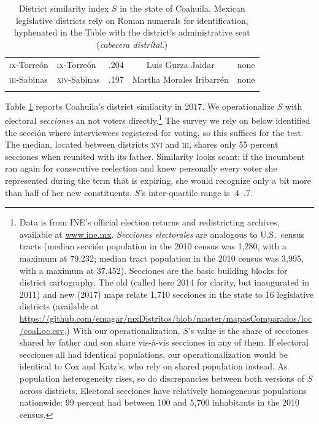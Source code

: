 \documentclass[letter,12pt]{article}
\begin{document}
\begin{table}
{\begin{tabular}{llrcc}
 \textsc{ix}-Torreón        & \textsc{ix}-Torreón         &  .204 & Luis Gurza Jaidar           & none            \\ 
 \textsc{iii}-Sabinas       & \textsc{xiv}-Sabinas        &  .197 & Martha Morales Iribarrén    & none            \\ 
 \\ [-1.2ex] \hline
\end{tabular}
}
\caption{District similarity index $S$ in the state of Coahuila. Mexican legislative districts rely on Roman numerals for identification, hyphenated in the Table with the district's administrative seat (\emph{cabecera distrital}.)}\label{T:dsi}
\end{table}

Table \ref{T:dsi} reports Coahuila's district similarity in 2017. We operationalize $S$ with electoral \emph{secciones} an not voters directly.\footnote{Data is from INE's official election returns and redistricting archives, available at \url{www.ine.mx}. \emph{Secciones electorales} are analogous to U.S.\ census tracts (median secci\'on population in the 2010 census was 1,280, with a maximum at 79,232; median tract population in the 2010 census was 3,995, with a maximum at 37,452). Secciones are the basic building blocks for district cartography. The old (called here 2014 for clarity, but inaugurated in 2011) and new (2017) maps relate 1,710 secciones in the state to 16 legislative districts (available at \url{https://github.com/emagar/mxDistritos/blob/master/mapasComparados/loc/coaLoc.csv}.) With our operationalization, $S$'s value is the share of secciones shared by father and son share vis-à-vis secciones in any of them. If electoral secciones all had identical populations, our operationalization would be identical to Cox and Katz's, who rely on shared population instead. As population heterogeneity rises, so do discrepancies between both versions of $S$ across districts. Electoral secciones have relatively homogeneous populations nationwide: 99 percent had between 100 and 5,700 inhabitants in the 2010 census.} The survey we rely on below identified the sección where interviewees registered for voting, so this suffices for the test. The median, located between districts \textsc{xvi} and \textsc{iii}, shares only 55 percent secciones when reunited with its father. Similarity looks scant: if the incumbent ran again for consecutive reelection and knew personally every voter she represented during the term that is expiring, she would recognize only a bit more than half of her new constituents. $S$'s inter-quartile range is .4--.7.
\end{document}
